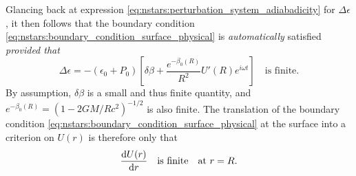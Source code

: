 Glancing back at expression \eqref{eq:nstars:perturbation_system_adiabadicity} for $\Delta \epsilon$, it then follows that the boundary condition \eqref{eq:nstars:boundary_condition_surface_physical} is \emph{automatically} satisfied \emph{provided that}
\begin{equation}
	\Delta \epsilon = - \left( \epsilon_0 + P_0 \right) \left[ \delta\beta + \frac{e^{-\beta_0(R)}}{R^2} U'(R) e^{i \omega t} \right] \quad \text{is finite}.
\end{equation}
By assumption, $\delta\beta$ is a small and thus finite quantity, and $e^{-\beta_0(R)} = \left( 1 - 2 G M / R c^2 \right)^{-1/2}$ is also finite.
The translation of the boundary condition \eqref{eq:nstars:boundary_condition_surface_physical} at the surface into a criterion on $U(r)$ is therefore only that
\begin{equation}
	\odv{U(r)}{r} \quad \text{is finite} \quad \text{at } r = R.
\label{eq:nstars:boundary_condition_surface_mathematical}
\end{equation}

